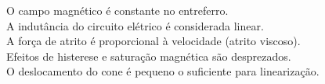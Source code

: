 \documentclass[preview]{standalone}
\begin{document}
O campo magnético é constante no entreferro.\\A indutância do circuito elétrico é considerada linear.\\A força de atrito é proporcional à velocidade (atrito viscoso).\\Efeitos de histerese e saturação magnética são desprezados.\\O deslocamento do cone é pequeno o suficiente para linearização.\\
\end{document}
